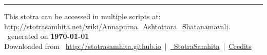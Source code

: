 \documentclass[a5paper,twoside,12pt]{book}
\begin{document}
\setmainfont[Script=Devanagari,Mapping=tex-text]{Sanskrit 2003}
\fontsize {16}{19.25}\selectfont
\let\head\chapt
\begin{center}

\end{center}
\vfill
\centering
\rule{0.8\textwidth}{0.6pt}

\footnotesize
{}\sffamily
This stotra can be accessed in multiple scripts at:\\
\url{http://stotrasamhita.net/wiki/Annapurna_Ashtottara_Shatanamavali}.\\[1ex]
\faFilePdfO~generated on \textbf{\today}\\[1ex]
Downloaded from \faGlobe{}~\url{http://stotrasamhita.github.io}~|~\href{https://github.com/StotraSamhita}{\faGithubSquare{}~StotraSamhita}~|~\href{https://stotrasamhita.github.io/about/}{Credits}
\end{document}
